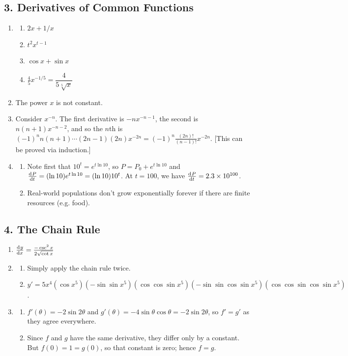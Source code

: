 \subsection*{3. Derivatives of Common Functions}
\begin{enumerate}
  \item
    \begin{enumerate}
      \item $ 2x + 1/x $
      \item $ t^2 x^{t - 1} $
      \item $ \cos x + \sin x $
      \item $ \frac{4}{5} x^{-1/5} = \dfrac{4}{5 \sqrt[5]{x}} $
    \end{enumerate}
  \item The power $ x $ is not constant.
  \item Consider $ x^{-n} $. The first derivative is $ -n x^{-n - 1} $, the second is $ n(n+1) x^{-n - 2} $, and so the $ n$th
        is $ (-1)^n n(n+1)\cdots(2n - 1)(2n) x^{-2n} = (-1)^n \frac{(2n)!}{(n-1)!} x^{-2n} $. [This can be proved via induction.]
  \item
    \begin{enumerate}
      \item Note first that $ 10^t = e^{t \ln 10} $, so $ P = P_0 + e^{t \ln 10} $ and $ \od{P}{t} = (\ln 10)e^{t \ln 10} = (\ln 10)10^t $.
            At $ t = 100 $, we have $ \od{P}{t} = \num{2.3e100} $.
      \item Real-world populations don't grow exponentially forever if there are finite resources (e.g. food).
    \end{enumerate}
\end{enumerate}

\subsection*{4. The Chain Rule}
\begin{enumerate}
  \item $ \od{y}{x} = \frac{-\csc^2 x}{2\sqrt{\cot x}} $
  \item
    \begin{enumerate}
      \item Simply apply the chain rule twice.
      \item $ y' = 5x^4 (\cos x^5)(-\sin \sin x^5)(\cos \cos \sin x^5)(-\sin \sin \cos \sin x^5)(\cos \cos \sin \cos \sin x^5) $.
    \end{enumerate}
  \item
    \begin{enumerate}
      \item $ f'(\theta) = -2 \sin 2\theta $ and $ g'(\theta) = -4\sin \theta \cos \theta = -2\sin 2\theta $, so $ f' = g' $ as they agree everywhere.
      \item Since $ f $ and $ g $ have the same derivative, they differ only by a constant. But $ f(0) = 1 = g(0) $, so that constant is zero; hence $ f = g $.
    \end{enumerate}
\end{enumerate}

